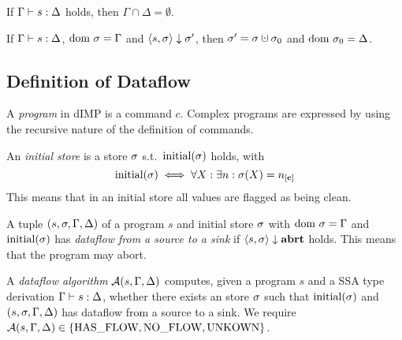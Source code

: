 \begin{theorem}
    \label{thm:ssa-gamma-delta-disjoint}
    If $\Gamma \vdash {s}: \Delta$ holds, then $\Gamma \cap \Delta = \emptyset$.
\end{theorem}

\begin{theorem}
    \label{thm:ssa-progress}
    If $\Gamma \vdash {s}: \Delta$, $\text{dom } \sigma = \Gamma$ and
    $\langle s, \sigma \rangle \downarrow \sigma'$, then $\store' = \store \dunion \store_0$
    and $\text{dom }{\sigma_0} = \Delta$.
\end{theorem}

\subsection{Definition of Dataflow}
\begin{definition}[Program]
    A \emph{program} in dIMP is a command $c$.
    Complex programs are expressed by using the recursive nature of the definition of commands.
\end{definition}

\begin{definition}
    An \emph{initial store} is a store $\sigma$ s.t.\ 
    $\text{initial}({\sigma}){}$ holds, with 
    \begin{equation*}
        \initialstore{} \iff \forall X: \exists n: \store(X) = \clean[n]
    \end{equation*}
    This means that in an initial store all values are flagged as being clean.
\end{definition}

\begin{definition}[Dataflow]
    A tuple $(s, \sigma, \Gamma, \Delta)$ of a program $s$ and initial store $\sigma{}$ 
    with $\text{dom }{\sigma{}} = \Gamma$ and $\text{initial}({\sigma})$ 
    has \emph{dataflow from a source to a sink} if
    $\langle s, \sigma{} \rangle \downarrow \textbf{abrt}$ holds.
    This means that the program may abort.
\end{definition}

\begin{definition}
    A \emph{dataflow algorithm} $\operatorname{\mathcal{A}}(s, \Gamma, \Delta)$ computes, given a program $s$
    and a SSA type derivation $\Gamma \vdash {s}: \Delta$,
    whether there exists an store $\sigma{}$ 
    such that $\text{initial}({\sigma})$ and $(s, \sigma, \Gamma, \Delta)$ has dataflow from a source to a sink.
    We require $\operatorname{\mathcal{A}}(s, \Gamma, \Delta) \in \{\text{HAS\_FLOW}, \text{NO\_FLOW}, \text{UNKOWN}\}$.
\end{definition}


